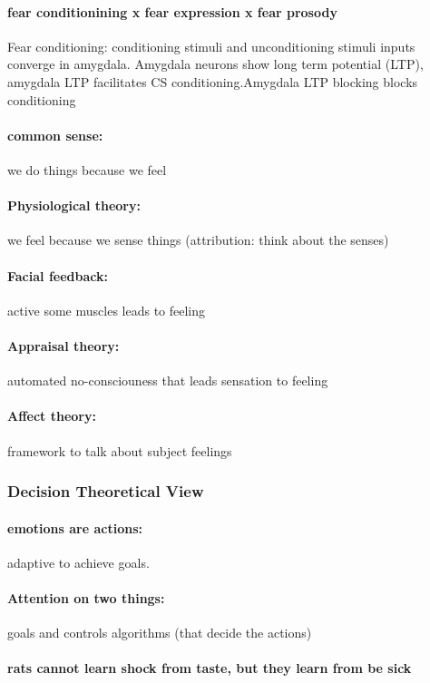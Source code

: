 \documentclass[12pt,article,oneside,a4paper]{memoir}
\begin{document}
\paragraph{fear conditionining x fear expression x fear prosody}
Fear conditioning: conditioning stimuli and unconditioning stimuli inputs converge in amygdala. Amygdala neurons show long term potential (LTP), amygdala LTP facilitates CS conditioning.Amygdala LTP blocking blocks conditioning
\paragraph{common sense:} we do things because we feel
\paragraph{Physiological theory:} we feel because we sense things (attribution: think about the senses)
\paragraph{Facial feedback:} active some muscles leads to feeling
\paragraph{Appraisal theory:} automated no-consciouness that leads sensation to feeling
\paragraph{Affect theory:} framework to talk about subject feelings

\subsubsection{ Decision Theoretical View}
\paragraph{emotions are actions:} adaptive to achieve goals.
\paragraph{Attention on two things:} goals and controls algorithms (that decide the actions)

\paragraph{rats cannot learn shock from taste, but they learn from be sick}
\end{document}
